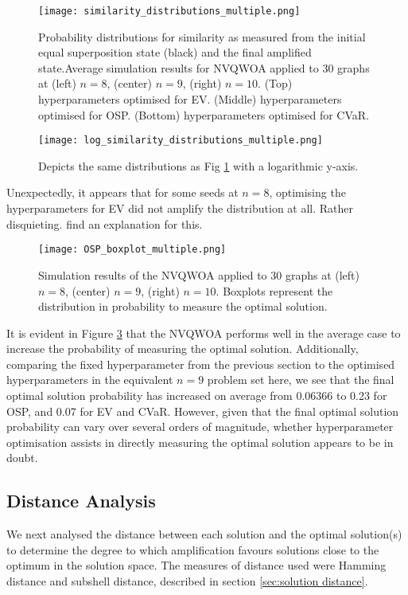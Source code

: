 \begin{figure}[htbp]
    \centering
    \texttt{[image: similarity\_distributions\_multiple.png]} 
    \caption{Probability distributions for similarity as measured from the initial equal superposition state (black) and the final amplified state.Average simulation results for NVQWOA applied to 30 graphs at (left) $n=8$, (center) $n=9$, (right) $n=10$. (Top) hyperparameters optimised for EV. (Middle) hyperparameters optimised for OSP. (Bottom) hyperparameters optimised for CVaR.}
    \label{fig:similarity dist}
\end{figure}

\begin{figure}[htbp]
    \centering
    \texttt{[image: log\_similarity\_distributions\_multiple.png]} 
    \caption{Depicts the same distributions as Fig \ref{fig:similarity dist} with a logarithmic y-axis.}
    \label{fig:similarity log dist}
\end{figure}

Unexpectedly, it appears that for some seeds at $n=8$, optimising the hyperparameters for EV did not amplify the distribution at all. Rather disquieting. find an explanation for this.

\begin{figure}[htbp]
    \centering
    \texttt{[image: OSP\_boxplot\_multiple.png]} 
    \caption{Simulation results of the NVQWOA applied to 30 graphs at (left)$n=8$, (center) $n=9$, (right) $n=10$. Boxplots represent the distribution in probability to measure the optimal solution.}
    \label{fig:osp}
\end{figure}

It is evident in Figure \ref{fig:osp} that the NVQWOA performs well in the average case to increase the probability of measuring the optimal solution. Additionally, comparing the fixed hyperparameter from the previous section to the optimised hyperparameters in the equivalent $n=9$ problem set here, we see that the final optimal solution probability has increased on average from 0.06366 to 0.23 for OSP, and 0.07 for EV and CVaR. However, given that the final optimal solution probability can vary over several orders of magnitude, whether hyperparameter optimisation assists in directly measuring the optimal solution appears to be in doubt.

\subsection{Distance Analysis}
We next analysed the distance between each solution and the optimal solution(s) to determine the degree to which amplification favours solutions close to the optimum in the solution space. The measures of distance used were Hamming distance and subshell distance, described in section \ref{sec:solution distance}.


